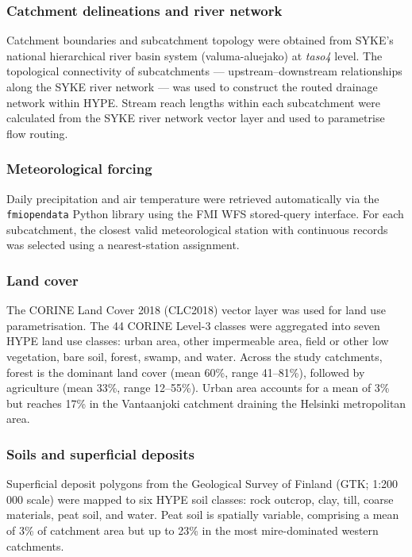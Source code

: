 \documentclass[draft]{agujournal2019}
\begin{document}
\subsubsection{Catchment delineations and river network}
Catchment boundaries and subcatchment topology were obtained from SYKE's national hierarchical river basin system (valuma-aluejako) at \textit{taso4} level. The topological connectivity of subcatchments — upstream–downstream relationships along the SYKE river network — was used to construct the routed drainage network within HYPE. Stream reach lengths within each subcatchment were calculated from the SYKE river network vector layer and used to parametrise flow routing.

\subsubsection{Meteorological forcing}
Daily precipitation and air temperature were retrieved automatically via the \texttt{fmiopendata} Python library using the FMI WFS stored-query interface. For each subcatchment, the closest valid meteorological station with continuous records was selected using a nearest-station assignment.

\subsubsection{Land cover}
The CORINE Land Cover 2018 (CLC2018) vector layer was used for land use parametrisation. The 44 CORINE Level-3 classes were aggregated into seven HYPE land use classes: urban area, other impermeable area, field or other low vegetation, bare soil, forest, swamp, and water. Across the study catchments, forest is the dominant land cover (mean 60\%, range 41--81\%), followed by agriculture (mean 33\%, range 12--55\%). Urban area accounts for a mean of 3\% but reaches 17\% in the Vantaanjoki catchment draining the Helsinki metropolitan area.

\subsubsection{Soils and superficial deposits}
Superficial deposit polygons from the Geological Survey of Finland (GTK; 1:200\,000 scale) were mapped to six HYPE soil classes: rock outcrop, clay, till, coarse materials, peat soil, and water. Peat soil is spatially variable, comprising a mean of 3\% of catchment area but up to 23\% in the most mire-dominated western catchments.
\end{document}
